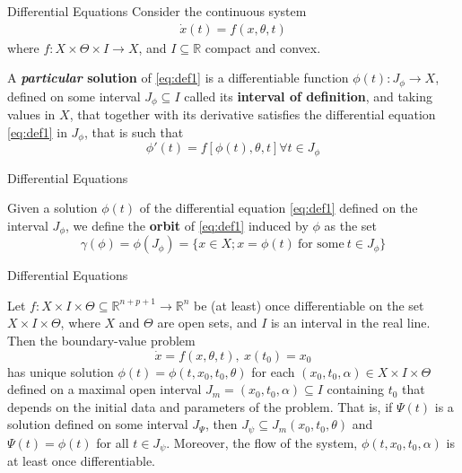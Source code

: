 \documentclass[aspectratio=169]{beamer}
\begin{document}
\begin{frame}{Differential Equations}
    Consider the continuous system \begin{align}\dot{x}(t)=f(x,\theta,t)\label{eq:def1}\end{align} where $f:X\times\Theta\times I\rightarrow X$, and $I\subseteq\mathds{R}$ compact and convex.
    \begin{definition}
        A \textbf{\textit{particular} solution} of \eqref{eq:def1} is a differentiable function $\phi(t):J_{\phi}\rightarrow X$, defined on some interval $J_{\phi}\subseteq I$ called its \textbf{interval of definition}, and taking values in $X$, that together with its derivative satisfies the differential equation \eqref{eq:def1} in $J_\phi$, that is such that \[\phi'(t)=f[\phi(t),\theta,t]\forall t\in J_\phi\]
    \end{definition}
\end{frame}

\begin{frame}{Differential Equations}
    \begin{definition}
        Given a solution $\phi(t)$ of the differential equation \eqref{eq:def1} defined on the interval $J_\phi$, we define the \textbf{orbit} of \eqref{eq:def1} induced by $\phi$ as the set \[\gamma(\phi)=\phi(J_\phi)=\{x\in X; x=\phi(t)\ \text{for some}\ t\in J_\phi\}\]
    \end{definition}
    
\end{frame}

\begin{frame}{Differential Equations}

\begin{theorem}
     Let $f:X\times I\times\Theta\subseteq\mathds{R}^{n+p+1}\rightarrow\mathds{R}^n$ be (at least) once differentiable on the set $X\times I\times \Theta$, where $X$ and $\Theta$ are open sets, and $I$ is an interval in the real line. Then the boundary-value problem \[\dot{x}=f(x,\theta,t),\ x(t_0)=x_0\] has unique solution $\phi(t)=\phi(t,x_0,t_0,\theta)$ for each $(x_0,t_0,\alpha)\in X\times I\times\Theta$ defined on a maximal open interval $J_m=(x_0,t_0,\alpha)\subseteq I$ containing $t_0$ that depends on the initial data and parameters of the problem. That is, if $\Psi(t)$ is a solution defined on some interval $J_\Psi$, then $J_\psi\subseteq J_m(x_0,t_0,\theta)$ and $\Psi(t)=\phi(t)$ for all $t\in J_\psi$. Moreover, the flow of the system, $\phi(t,x_0,t_0,\alpha)$ is at least once differentiable. 
\end{theorem}
    
\end{frame}
\end{document}
